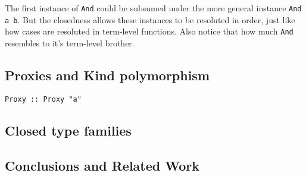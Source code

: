 \documentclass[pldi]{sigplanconf-pldi16}
\begin{document}
The first instance of \texttt{And} could be subsumed
under the more general instance \texttt{And a b}.
But the closedness allows these instances to be resoluted in order, just like
how cases are resoluted in term-level functions. Also notice that how much
\texttt{And} resembles to it's term-level brother.


%
%


%



\subsection{Proxies and Kind polymorphism}

%
%


\begin{verbatim}
Proxy :: Proxy "a"
\end{verbatim}

\subsection{Closed type families}

\subsection{Conclusions and Related Work}




\end{document}
